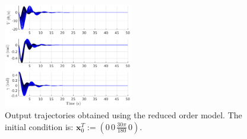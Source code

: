 \documentclass[letterpaper, 10 pt, conference]{ieeeconf}  %
\newcommand{\vo}[1]{\boldsymbol{#1}}
\begin{document}
\begin{figure}[h!]
   \includegraphics[width=0.5\textwidth]{figs/yTrajRed.eps}
   \caption{Output trajectories obtained using the reduced order model. The initial condition is: $\vo{x}_0^T := (0\, 0\, \frac{30 \pi}{180}\, 0)$.}
   \label{yTrajRed}
\end{figure}
\end{document}
